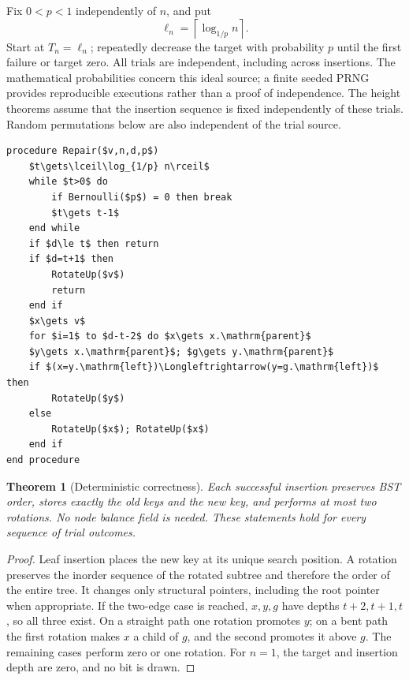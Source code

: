 \documentclass[11pt]{article}
\newtheorem{theorem}{Theorem}[section]
\newcommand{\ceil}[1]{\left\lceil #1\right\rceil}
\begin{document}
Fix $0<p<1$ independently of $n$, and put
\[
  \ell_n=\ceil{\log_{1/p} n}.
\]
Start at $T_n=\ell_n$; repeatedly decrease the target with probability $p$
until the first failure or target zero. All trials are independent, including
across insertions. The mathematical probabilities concern this ideal source;
a finite seeded PRNG provides reproducible executions rather than a proof of
independence. The height theorems assume that the insertion sequence is fixed
independently of these trials. Random permutations below are also independent
of the trial source.

\begin{lstlisting}[caption={Repair after ordinary leaf insertion.}]
procedure Repair($v,n,d,p$)
    $t\gets\lceil\log_{1/p} n\rceil$
    while $t>0$ do
        if Bernoulli($p$) = 0 then break
        $t\gets t-1$
    end while
    if $d\le t$ then return
    if $d=t+1$ then
        RotateUp($v$)
        return
    end if
    $x\gets v$
    for $i=1$ to $d-t-2$ do $x\gets x.\mathrm{parent}$
    $y\gets x.\mathrm{parent}$; $g\gets y.\mathrm{parent}$
    if $(x=y.\mathrm{left})\Longleftrightarrow(y=g.\mathrm{left})$ then
        RotateUp($y$)
    else
        RotateUp($x$); RotateUp($x$)
    end if
end procedure
\end{lstlisting}

\begin{theorem}[Deterministic correctness]\label{thm:correct}
Each successful insertion preserves BST order, stores exactly the old keys and
the new key, and performs at most two rotations. No node balance field is
needed. These statements hold for every sequence of trial outcomes.
\end{theorem}
\begin{proof}
Leaf insertion places the new key at its unique search position. A rotation
preserves the inorder sequence of the rotated subtree and therefore the order
of the entire tree. It changes only structural pointers, including the root
pointer when appropriate. If the two-edge case is reached, $x,y,g$ have depths
$t+2,t+1,t$, so all three exist. On a straight path one rotation promotes $y$;
on a bent path the first rotation makes $x$ a child of $g$, and the second
promotes it above $g$. The remaining cases perform zero or one rotation.
For $n=1$, the target and insertion depth are zero, and no bit is drawn.
\end{proof}
\end{document}
